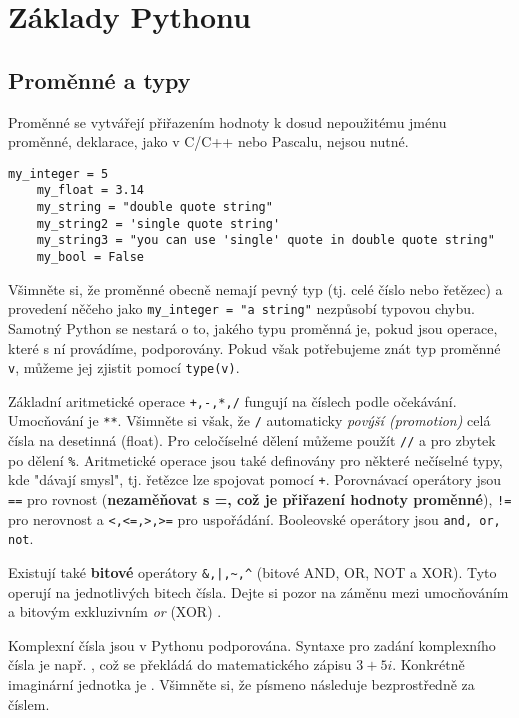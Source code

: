 \newpage
\section{Základy Pythonu}

\subsection{Proměnné a typy}

Proměnné se vytvářejí přiřazením hodnoty k dosud nepoužitému jménu proměnné, deklarace, jako v C/C++ nebo Pascalu, nejsou nutné.
\begin{lstlisting}[caption=Definování proměnných]
    my_integer = 5
    my_float = 3.14
    my_string = "double quote string"
    my_string2 = 'single quote string'
    my_string3 = "you can use 'single' quote in double quote string"
    my_bool = False
\end{lstlisting}

Všimněte si, že proměnné obecně nemají pevný typ (tj. celé číslo nebo řetězec) a provedení něčeho jako \lstinline{my_integer = "a string"} nezpůsobí typovou chybu. Samotný Python se nestará o to, jakého typu proměnná je, pokud jsou operace, které s ní provádíme, podporovány. Pokud však potřebujeme znát typ proměnné \lstinline{v}, můžeme jej zjistit pomocí \lstinline{type(v)}.

Základní aritmetické operace \verb|+,-,*,/| fungují na číslech podle očekávání. Umocňování je \verb|**|. Všimněte si však, že \verb|/| automaticky \emph{povýší (promotion)} celá čísla na desetinná (float). Pro celočíselné dělení můžeme použít \verb|//| a pro zbytek po dělení \verb|%|. Aritmetické operace jsou také definovány pro některé nečíselné typy, kde "dávají smysl", tj. řetězce lze spojovat pomocí \verb|+|. Porovnávací operátory jsou \verb|==| pro rovnost (\textbf{nezaměňovat s =, což je přiřazení hodnoty proměnné}), \verb|!=| pro nerovnost a \verb|<,<=,>,>=| pro uspořádání. Booleovské operátory jsou \verb|and, or, not|.

Existují také \textbf{bitové} operátory \lstinline{&,|,~,^} (bitové AND, OR, NOT a XOR). Tyto operují na jednotlivých bitech čísla. Dejte si pozor na záměnu mezi umocňováním \ls{**} a bitovým exkluzivním \emph{or} (XOR) \ls{^}.

Komplexní čísla jsou v Pythonu podporována. Syntaxe pro zadání komplexního čísla je např. , což se překládá do matematického zápisu $3 + 5i$. Konkrétně imaginární jednotka je . Všimněte si, že písmeno  následuje bezprostředně za číslem.

